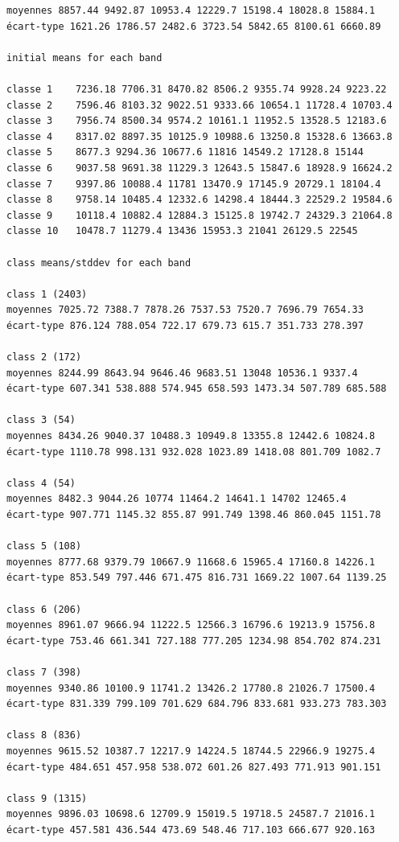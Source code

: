 \documentclass[earth,article,accept,pdftex,moreauthors]{Definitions/mdpi}
\begin{document}
{\begin{scriptsize}
\begin{verbatim}
moyennes 8857.44 9492.87 10953.4 12229.7 15198.4 18028.8 15884.1
écart-type 1621.26 1786.57 2482.6 3723.54 5842.65 8100.61 6660.89

initial means for each band

classe 1    7236.18 7706.31 8470.82 8506.2 9355.74 9928.24 9223.22
classe 2    7596.46 8103.32 9022.51 9333.66 10654.1 11728.4 10703.4
classe 3    7956.74 8500.34 9574.2 10161.1 11952.5 13528.5 12183.6
classe 4    8317.02 8897.35 10125.9 10988.6 13250.8 15328.6 13663.8
classe 5    8677.3 9294.36 10677.6 11816 14549.2 17128.8 15144
classe 6    9037.58 9691.38 11229.3 12643.5 15847.6 18928.9 16624.2
classe 7    9397.86 10088.4 11781 13470.9 17145.9 20729.1 18104.4
classe 8    9758.14 10485.4 12332.6 14298.4 18444.3 22529.2 19584.6
classe 9    10118.4 10882.4 12884.3 15125.8 19742.7 24329.3 21064.8
classe 10   10478.7 11279.4 13436 15953.3 21041 26129.5 22545

class means/stddev for each band

class 1 (2403)
moyennes 7025.72 7388.7 7878.26 7537.53 7520.7 7696.79 7654.33
écart-type 876.124 788.054 722.17 679.73 615.7 351.733 278.397

class 2 (172)
moyennes 8244.99 8643.94 9646.46 9683.51 13048 10536.1 9337.4
écart-type 607.341 538.888 574.945 658.593 1473.34 507.789 685.588

class 3 (54)
moyennes 8434.26 9040.37 10488.3 10949.8 13355.8 12442.6 10824.8
écart-type 1110.78 998.131 932.028 1023.89 1418.08 801.709 1082.7

class 4 (54)
moyennes 8482.3 9044.26 10774 11464.2 14641.1 14702 12465.4
écart-type 907.771 1145.32 855.87 991.749 1398.46 860.045 1151.78

class 5 (108)
moyennes 8777.68 9379.79 10667.9 11668.6 15965.4 17160.8 14226.1
écart-type 853.549 797.446 671.475 816.731 1669.22 1007.64 1139.25

class 6 (206)
moyennes 8961.07 9666.94 11222.5 12566.3 16796.6 19213.9 15756.8
écart-type 753.46 661.341 727.188 777.205 1234.98 854.702 874.231

class 7 (398)
moyennes 9340.86 10100.9 11741.2 13426.2 17780.8 21026.7 17500.4
écart-type 831.339 799.109 701.629 684.796 833.681 933.273 783.303

class 8 (836)
moyennes 9615.52 10387.7 12217.9 14224.5 18744.5 22966.9 19275.4
écart-type 484.651 457.958 538.072 601.26 827.493 771.913 901.151

class 9 (1315)
moyennes 9896.03 10698.6 12709.9 15019.5 19718.5 24587.7 21016.1
écart-type 457.581 436.544 473.69 548.46 717.103 666.677 920.163


\end{verbatim}
\end{scriptsize}}
\end{document}
